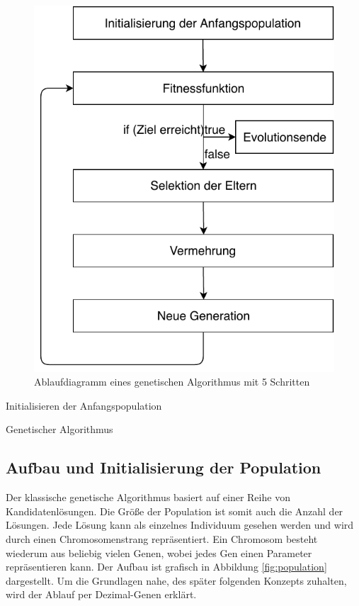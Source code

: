 \noindent%
\begin{figure}[H]
  \centering  
  \includegraphics[scale=0.8]{img/Ablauf_kurz.pdf}
  \caption{Ablaufdiagramm eines genetischen Algorithmus mit 5 Schritten}
  \label{fig:Ablauf_kurz}
\end{figure}


\begin{algorithm}[h]
\SetAlgoLined
Initialisieren der Anfangspopulation\;
\caption{Genetischer Algorithmus} \label{GA}
\end{algorithm}


\newpage
\subsection{Aufbau und Initialisierung  der Population}
Der klassische genetische Algorithmus basiert auf einer Reihe von Kandidatenlösungen. Die Größe der Population ist somit auch die Anzahl der Lösungen. Jede Lösung kann als einzelnes Individuum gesehen werden und wird durch einen Chromosomenstrang repräsentiert. Ein Chromosom besteht wiederum aus beliebig vielen Genen, wobei jedes Gen einen Parameter repräsentieren kann. Der Aufbau ist grafisch in Abbildung \ref{fig:population} dargestellt. Um die Grundlagen nahe, des später folgenden Konzepts zuhalten, wird der Ablauf per Dezimal-Genen erklärt\cite[p.~134]{Gad2018}. 


